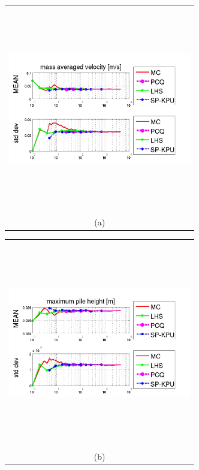 \documentclass{article}
\newcommand{\Pic}[2][0.85]{\begin{center}\texttt{[image: \#2]}
 \end{center} }
\begin{document}
\begin{figure}[H]
      \begin{minipage}[b]{0.6\textwidth}
        \begin{tabular}{c}
       \includegraphics[width=8cm,height=9cm,keepaspectratio]{fig/picskpu/unu_KPU.jpg}\\
        (a)
        \end{tabular}
    \end{minipage}
      \begin{minipage}[b]{0.6\textwidth}
        \begin{tabular}{c}
       \includegraphics[width=8cm,height=9cm,keepaspectratio]{fig/picskpu/doi_KPU.jpg}\\
        (b)

\end{tabular}
\end{minipage}
\end{figure}
\end{document}
